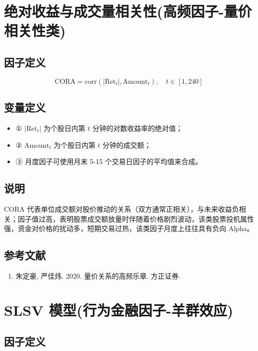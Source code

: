 \documentclass{article}
\begin{document}
\section{绝对收益与成交量相关性(高频因子-量价相关性类)}

\subsection{因子定义}
\begin{equation}
    \mathrm{CORA} = \mathrm{corr}(| \mathrm{Ret}_t |, \mathrm{Amount}_t), \quad t \in [1, 240]
\end{equation}

\subsection{变量定义}
\begin{itemize}
    \item ① \( | \mathrm{Ret}_t | \) 为个股日内第 \( t \) 分钟的对数收益率的绝对值；
    \item ② \( \mathrm{Amount}_t \) 为个股日内第 \( t \) 分钟的成交额；
    \item ③ 月度因子可使用月末 5-15 个交易日因子的平均值来合成。
\end{itemize}

\subsection{说明}
CORA 代表单位成交额对股价推动的关系（双方通常正相关），与未来收益负相关；因子值过高，表明股票成交额放量时伴随着价格剧烈波动，该类股票投机属性强，资金对价格的扰动多，短期交易过热，该类因子月度上往往具有负向 Alpha。

\subsection{参考文献}
\begin{enumerate}
    \item 朱定豪, 严佳炜. 2020. 量价关系的高频乐章. 方正证券.
\end{enumerate}

\section{SLSV 模型(行为金融因子-羊群效应)}

\subsection{因子定义}
\end{document}
